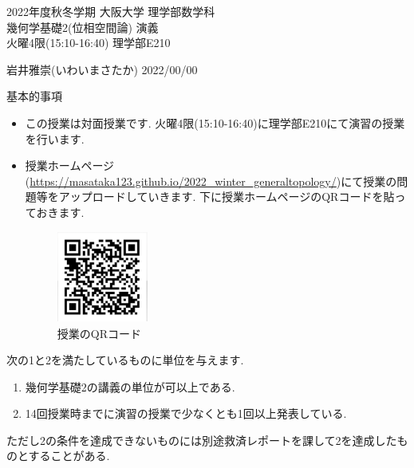 \documentclass[dvipdfmx,a4paper,11pt]{article}
\theoremstyle{definition}
\begin{document}

\newpage
\begin{center}
{\Large 2022年度秋冬学期 大阪大学 理学部数学科 \\ 幾何学基礎2(位相空間論) 演義} \\
 火曜4限(15:10-16:40) 理学部E210
\end{center}
\begin{flushright}
 岩井雅崇(いわいまさたか) 2022/00/00 \\
\end{flushright}
{\large 基本的事項}
\begin{itemize}
  \setlength{\parskip}{0cm} %
  \setlength{\itemsep}{0cm} %
\item この授業は対面授業です. 火曜4限(15:10-16:40)に理学部E210にて演習の授業を行います.
\item 授業ホームページ(\url{https://masataka123.github.io/2022_winter_generaltopology/})にて授業の問題等をアップロードしていきます. 
下に授業ホームページのQRコードを貼っておきます. 
\begin{figure}[htbp]
\begin{center}
 \includegraphics[height=30mm, width=30mm]{genetopo.png}
 \caption*{授業のQRコード}
\end{center}
\end{figure}
\end{itemize}

\hspace{-18pt}{\large 成績に関して}

次の1と2を満たしているものに単位を与えます.
\begin{enumerate}
  \setlength{\parskip}{0cm} %
  \setlength{\itemsep}{0cm} %
\item 幾何学基礎2の講義の単位が可以上である.
\item 14回授業時までに演習の授業で少なくとも1回以上発表している.
\end{enumerate}
ただし2の条件を達成できないものには別途救済レポートを課して2を達成したものとすることがある.
\end{document}
